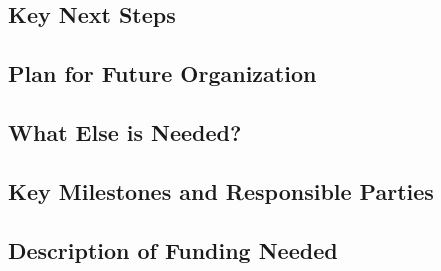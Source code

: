 \subsection{Key Next Steps}


\subsection{Plan for Future Organization}


\subsection{What Else is Needed?}


\subsection{Key Milestones and Responsible Parties}


\subsection{Description of Funding Needed}

